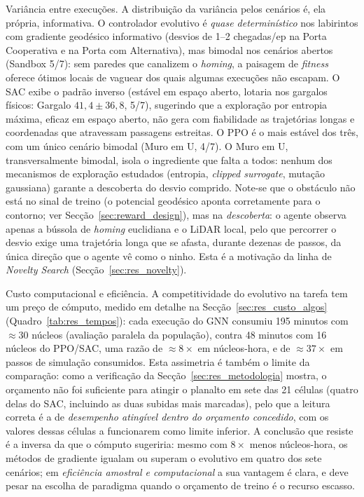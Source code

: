 \documentclass[12pt,reqno, twoside]{amsbook}
\makeatletter
\def\paragraph{\@startsection{paragraph}{4}%
  \z@\z@{-\fontdimen2\font}%
  {\normalfont\bfseries}}
\theoremstyle{plain}
\numberwithin{equation}{chapter}
\numberwithin{section}{chapter}
\numberwithin{table}{chapter}
\numberwithin{figure}{chapter}
\makeatother
\begin{document}
\paragraph{Variância entre execuções.} A distribuição da variância pelos cenários é, ela própria, informativa. O controlador evolutivo é \emph{quase determinístico} nos labirintos com gradiente geodésico informativo (desvios de 1--2 chegadas/ep na Porta Cooperativa e na Porta com Alternativa), mas bimodal nos cenários abertos (Sandbox 5/7): sem paredes que canalizem o \textit{homing}, a paisagem de \textit{fitness} oferece ótimos locais de vaguear dos quais algumas execuções não escapam. O SAC exibe o padrão inverso (estável em espaço aberto, lotaria nos gargalos físicos: Gargalo $41{,}4 \pm 36{,}8$, 5/7), sugerindo que a exploração por entropia máxima, eficaz em espaço aberto, não gera com fiabilidade as trajetórias longas e coordenadas que atravessam passagens estreitas. O PPO é o mais estável dos três, com um único cenário bimodal (Muro em U, 4/7). O Muro em U, transversalmente bimodal, isola o ingrediente que falta a todos: nenhum dos mecanismos de exploração estudados (entropia, \textit{clipped surrogate}, mutação gaussiana) garante a descoberta do desvio comprido. Note-se que o obstáculo não está no sinal de treino (o potencial geodésico aponta corretamente para o contorno; ver Secção~\ref{sec:reward_design}), mas na \emph{descoberta}: o agente observa apenas a bússola de \textit{homing} euclidiana e o LiDAR local, pelo que percorrer o desvio exige uma trajetória longa que se afasta, durante dezenas de passos, da única direção que o agente vê como o ninho. Esta é a motivação da linha de \textit{Novelty Search} (Secção~\ref{sec:res_novelty}).

\paragraph{Custo computacional e eficiência.} A competitividade do evolutivo na tarefa tem um preço de cómputo, medido em detalhe na Secção~\ref{sec:res_custo_algos} (Quadro~\ref{tab:res_tempos}): cada execução do GNN consumiu 195 minutos com $\approx 30$ núcleos (avaliação paralela da população), contra 48 minutos com 16 núcleos do PPO/SAC, uma razão de $\approx 8\times$ em núcleos-hora, e de $\approx 37\times$ em passos de simulação consumidos. Esta assimetria é também o limite da comparação: como a verificação da Secção~\ref{sec:res_metodologia} mostra, o orçamento não foi suficiente para atingir o planalto em sete das 21 células (quatro delas do SAC, incluindo as duas subidas mais marcadas), pelo que a leitura correta é a de \emph{desempenho atingível dentro do orçamento concedido}, com os valores dessas células a funcionarem como limite inferior. A conclusão que resiste é a inversa da que o cómputo sugeriria: mesmo com $8\times$ menos núcleos-hora, os métodos de gradiente igualam ou superam o evolutivo em quatro dos sete cenários; em \emph{eficiência amostral e computacional} a sua vantagem é clara, e deve pesar na escolha de paradigma quando o orçamento de treino é o recurso escasso.
\end{document}
